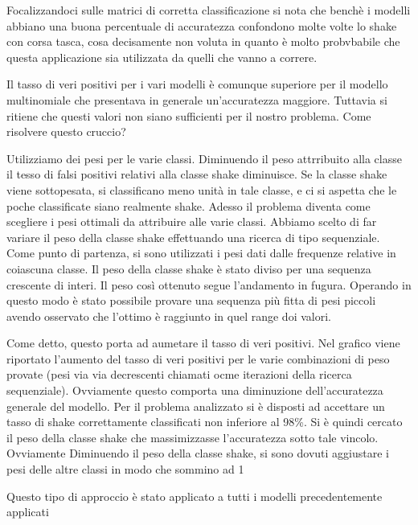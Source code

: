 %
Focalizzandoci sulle matrici di corretta classificazione si nota che benchè i modelli abbiano una buona percentuale di accuratezza confondono molte volte lo shake con corsa tasca, cosa decisamente non voluta in quanto è molto probvbabile che questa applicazione sia utilizzata da quelli che vanno a correre. 
%

%
Il tasso di veri positivi per i vari modelli è comunque superiore per il modello multinomiale che presentava in generale un'accuratezza maggiore. Tuttavia si ritiene che questi valori non siano sufficienti per il nostro problema. Come risolvere questo cruccio?
%

%
Utilizziamo dei pesi per le varie classi. Diminuendo il peso attrribuito alla classe il tesso di falsi positivi relativi alla classe shake diminuisce.
Se la classe shake viene sottopesata, si classificano meno unità in tale classe, e ci si aspetta che le poche classificate siano realmente shake. 
Adesso il problema diventa come scegliere i pesi ottimali da attribuire alle varie classi. Abbiamo scelto di far variare il peso della classe shake effettuando una ricerca di tipo sequenziale. Come punto di partenza, si sono utilizzati i pesi dati dalle frequenze relative in coiascuna classe. Il peso della classe shake è stato diviso per una sequenza crescente di interi. Il peso così ottenuto segue l\rq{}andamento in fugura. Operando in questo modo è stato possibile provare una sequenza più fitta di pesi piccoli avendo osservato che l\rq{}ottimo è raggiunto in quel range doi valori.
%

%
Come detto, questo porta ad aumetare il tasso di veri positivi. Nel grafico viene riportato l\rq{}aumento del tasso di veri positivi per le varie combinazioni di peso provate (pesi via via decrescenti chiamati ocme iterazioni della ricerca sequenziale).
Ovviamente questo comporta una diminuzione dell\rq{}accuratezza generale del modello. Per il problema analizzato si è disposti ad accettare un tasso di shake correttamente classificati non inferiore al 98\%. Si è quindi cercato il peso della classe shake che massimizzasse l\rq{}accuratezza sotto tale vincolo.
Ovviamente Diminuendo il peso della classe shake, si sono dovuti aggiustare i pesi delle altre classi in modo che sommino ad 1
%

%
Questo tipo di approccio è stato applicato a tutti i modelli precedentemente applicati


